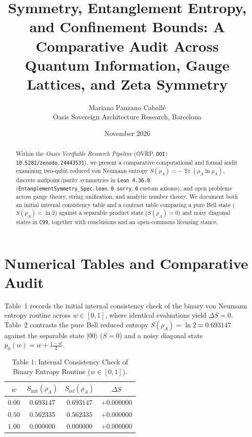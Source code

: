 \documentclass[11pt,a4paper]{article}
\title{Symmetry, Entanglement Entropy, and Confinement Bounds: A Comparative Audit Across Quantum Information, Gauge Lattices, and Zeta Symmetry}
\author{Mariano Panzano Caball\'e \\ \small Oasis Sovereign Architecture Research, Barcelona}
\date{November 2026}
\begin{document}
\maketitle

\begin{abstract}
Within the \emph{Oasis Verifiable Research Pipeline} (OVRP, \texttt{DOI: 10.5281/zenodo.24443531}), we present a comparative computational and formal audit examining two-qubit reduced von Neumann entropy $S(\rho_A) = -\operatorname{Tr}(\rho_A \ln \rho_A)$, discrete midpoint/parity symmetries in \texttt{Lean~4.36.0} (\texttt{EntanglementSymmetry\_Spec.lean}, \texttt{0 sorry}, \texttt{0} custom axioms), and open problems across gauge theory, string unification, and analytic number theory. We document both an initial internal consistency table and a contrast table comparing a pure Bell state ($S(\rho_A) = \ln 2$) against a separable product state ($S(\rho_A) = 0$) and noisy diagonal states in \texttt{C99}, together with conclusions and an open-commons licensing stance.
\end{abstract}

\section{Numerical Tables and Comparative Audit}
Table~1 records the initial internal consistency check of the binary von Neumann entropy routine across $w \in [0, 1]$, where identical evaluations yield $\Delta S = 0$. Table~2 contrasts the pure Bell reduced entropy $S(\rho_A) = \ln 2 \approx 0.693147$ against the separable state $|00\rangle$ ($S = 0$) and a noisy diagonal state $p_0(w) = w + \frac{1-w}{2}$.

\begin{table}[h!]
\centering
\caption{Table 1: Internal Consistency Check of Binary Entropy Routine ($w \in [0, 1]$).}
\begin{tabular}{cccc}
\hline
$w$ & $S_{\mathrm{init}}(\rho_A)$ & $S_{\mathrm{ref}}(\rho_A)$ & $\Delta S$ \\
\hline
$0.00$ & $0.693147$ & $0.693147$ & $+0.000000$ \\
$0.50$ & $0.562335$ & $0.562335$ & $+0.000000$ \\
$1.00$ & $0.000000$ & $0.000000$ & $+0.000000$ \\
\hline
\end{tabular}
\end{table}
\end{document}
